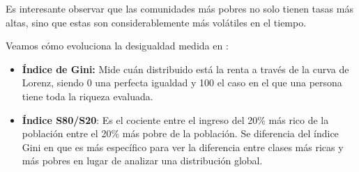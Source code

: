 \documentclass[11pt]{article}
\begin{document}
    Es interesante observar que las comunidades más pobres no solo tienen
tasas más altas, sino que estas son considerablemente más volátiles en
el tiempo.

Veamos cómo evoluciona la desigualdad medida en :

\begin{itemize}
\item
  \textbf{Índice de Gini:} Mide cuán distribuido está la renta a través
  de la curva de Lorenz, siendo 0 una perfecta igualdad y 100 el caso en
  el que una persona tiene toda la riqueza evaluada.
\item
  \textbf{Índice S80/S20}: Es el cociente entre el ingreso del 20\% más
  rico de la población entre el 20\% más pobre de la población. Se
  diferencia del índice Gini en que es más específico para ver la
  diferencia entre clases más ricas y más pobres en lugar de analizar
  una distribución global.
\end{itemize}
\end{document}
